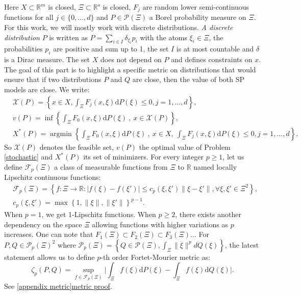 \documentclass{amsart}
\newcommand{\argmin}{\mathop{\arg\min}}
\newcommand{\RR}{\mathbb{R}}
\begin{document}
Here $X\subset\RR^m$ is closed, $\Xi\subset\RR^s$ is closed, $F_j$ are random lower semi-continuous functions for all $j\in\{0,...,d\}$ and $P\in\mathcal{P}\left(\Xi\right)$ a Borel probability measure on $\Xi$. For this work, we will mostly work with discrete distributions. \emph{A discrete distribution} $P$ is written as $P=\sum_{i\in I}\delta_{\xi_i}p_i$ with the atoms $\xi_i\in\Xi$, the probabilities $p_i$ are positive and sum up to 1, the set $I$ is at most countable and $\delta$ is a Dirac measure. The set $X$ does not depend on $P$ and defines constraints on $x$. The goal of this part is to highlight a specific metric on distributions that would ensure that if two distributions $P$ and $Q$ are close, then the value of both SP models are close. We write:
\begin{align*}
    &\mathcal{X}\left(P\right)=\left\{x\in X, \int_\Xi F_j\left(x,\xi\right)\text{d}P\left(\xi\right)\leq0, j=1,...,d\right\},\\
    &v\left(P\right)=\inf\left\{\int_\Xi F_0\left(x,\xi\right)\text{d}P\left(\xi\right)\:,\: x\in \mathcal{X}\left(P\right)\right\}, \\
    &X^*\left(P\right)=\argmin\left\{\int_\Xi F_0\left(x,\xi\right)\text{d}P\left(\xi\right)\:,\: x\in X, \: \int_\Xi F_j\left(x,\xi\right)\text{d}P\left(\xi\right)\leq0, j=1,...,d\right\}.
\end{align*}
So $\mathcal{X}\left(P\right)$ denotes the feasible set, $v\left(P\right)$ the optimal value of Problem \eqref{stochastic} and $X^*\left(P\right)$ its set of minimizers. For every integer $p\geq 1$, let us define $\mathcal{F}_p\left(\Xi\right)$ a class of measurable functions from $\Xi$ to $\RR$ named locally Lipschitz continuous functions:
\begin{align*}
    &\mathcal{F}_p\left(\Xi\right)=\left\{f:\Xi\to \RR: \lvert f\left(\xi\right)-f\left(\xi'\right)\rvert \leq c_p\left(\xi,\xi'\right)\lVert\xi-\xi'\rVert, \forall \xi,\xi'\in \Xi^2 \right\}, \\
   & c_p\left(\xi,\xi'\right)=\max \left\{1,\lVert\xi \rVert,\lVert\xi'\rVert\right\}^{p-1}.
\end{align*}
When $p=1$, we get 1-Lipschitz functions. When $p\geq 2$, there exists another dependency on the space $\Xi$ allowing functions with higher variations as $p$ increases. One can note that $F_1\left(\Xi\right)\subset F_2\left(\Xi\right)\subset F_3\left(\Xi\right) \hdots$ For $P,Q\in\mathcal{P}_p\left(\Xi\right)^2$ where $\mathcal{P}_p\left(\Xi\right)=\left\{Q\in\mathcal{P}\left(\Xi\right), \int_\Xi \lVert\xi\rVert^pdQ\left(\xi\right)\right\}$, the latest statement allows us to define $p$-th order Fortet-Mourier metric as:
$$
\zeta_p\left(P,Q\right)=\sup_{f\in\mathcal{F}_p\left(\Xi\right)}\lvert \int_\Xi f\left(\xi\right)\text{d}P\left(\xi\right)-\int_\Xi f\left(\xi\right)\text{d}Q\left(\xi\right)\rvert.
$$
See \ref{appendix metric}\href{https://www.imo.universite-paris-saclay.fr/~pierre-loic.meliot/master/exam-2017.pdf}{metric proof}.
\end{document}

